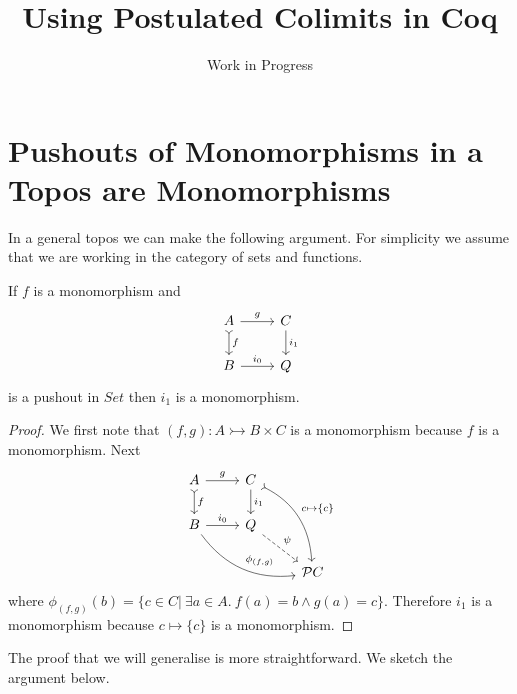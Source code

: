 \message{ !name(talk2018-03-05.tex)}\documentclass{article}
\title{Using Postulated Colimits in Coq}
\author{Work in Progress}
\begin{document}
\section{Pushouts of Monomorphisms in a Topos are Monomorphisms}
\label{sec:pushouts-of-monomorphisms-are-monomorphisms}

In a general topos we can make the following argument.
For simplicity we assume that we are working in the category of sets and functions.

\begin{lemma}\label{lem:pushout-of-mono}
  If $f$ is a monomorphism and
  \begin{equation*}
    \begin{tikzcd}
     A \rar{g} \dar[rightarrowtail]{f} & C\dar{i_1}\\
     B \rar{i_0} & Q
    \end{tikzcd}
  \end{equation*}
  is a pushout in $Set$ then $i_1$ is a monomorphism.
  \begin{proof}
    We first note that $(f,g):A \rightarrowtail B\times C$ is a monomorphism because $f$ is a monomorphism.
    Next
    \begin{equation*}
      \begin{tikzcd}
       A \rar{g} \dar[rightarrowtail]{f} & C\dar{i_1} \arrow[bend left,rightarrowtail]{ddr}{c\mapsto \{c\}} & {}\\
       B \rar{i_0} \arrow[bend right]{rrd}{\phi_{(f,g)}} & Q \drar[dashed]{\psi} & {}\\
       {} & {} & \mathcal P C
      \end{tikzcd}
    \end{equation*}
    where $\phi_{(f,g)}(b)=\{c\in C|~\exists a\in A.~f(a)=b \wedge g(a)=c\}$.
    Therefore $i_1$ is a monomorphism because $c\mapsto \{c\}$ is a monomorphism.
  \end{proof}
\end{lemma}

The proof that we will generalise is more straightforward.
We sketch the argument below.
\end{document}
